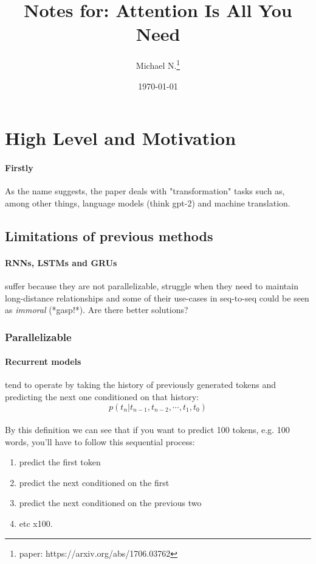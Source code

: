 \documentclass{article}
\title{Notes for: Attention Is All You Need}
\author{Michael N.\thanks{paper: https://arxiv.org/abs/1706.03762}}
\date{\today}
\begin{document}
    \maketitle
    
    \section{High Level and Motivation}
    
    \paragraph{Firstly} As the name suggests, the paper deals with "transformation" tasks such as, among other things, language models (think gpt-2) and machine translation.

    \subsection{Limitations of previous methods}
    \paragraph{RNNs, LSTMs and GRUs} suffer because they are not parallelizable, struggle when they need to maintain long-distance relationships and some of their use-cases in seq-to-seq could be seen as \emph{immoral} (*gasp!*). Are there better solutions?

    \subsubsection{Parallelizable}
    \paragraph{Recurrent models} tend to operate by taking the history of previously generated tokens and predicting the next one conditioned on that history:
    $$p(t_n|t_{n-1}, t_{n-2}, \cdots, t_1, t_0)$$

    \paragraph{} By this definition we can see that if you want to predict 100 tokens, e.g. 100 words, you'll have to follow this sequential process: 
    \begin{enumerate}
        \item predict the first token
        \item predict the next conditioned on the first
        \item predict the next conditioned on the previous two
        \item etc x100.
    \end{enumerate}
\end{document}
